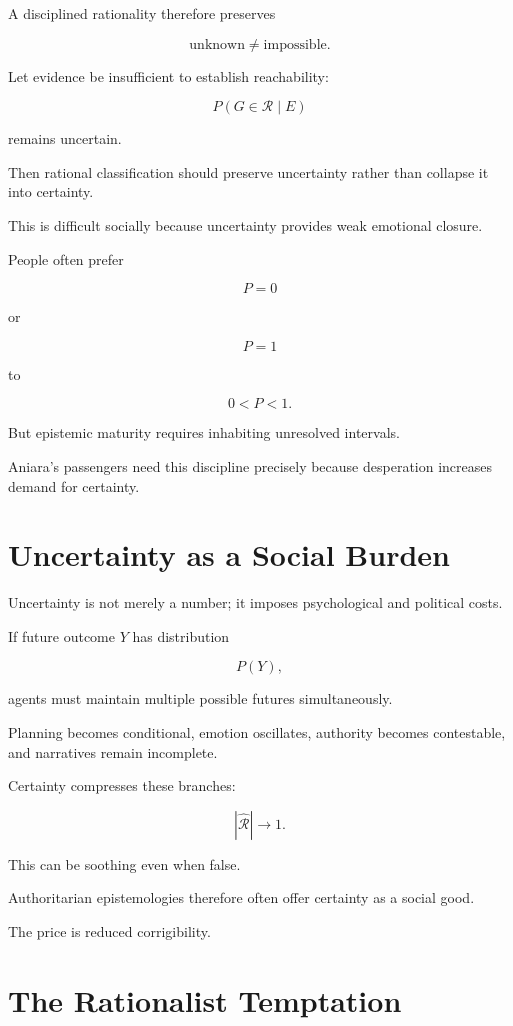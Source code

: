 \documentclass[11pt,oneside]{book}
\theoremstyle{definition}
\theoremstyle{remark}
\newcommand{\R}{\mathcal{R}}
\begin{document}
A disciplined rationality therefore preserves

\[
\text{unknown}
\neq
\text{impossible}.
\]

Let evidence be insufficient to establish reachability:

\[
P(G\in\R\mid E)
\]

remains uncertain.

Then rational classification should preserve uncertainty rather than collapse it into certainty.

This is difficult socially because uncertainty provides weak emotional closure.

People often prefer

\[
P=0
\]

or

\[
P=1
\]

to

\[
0<P<1.
\]

But epistemic maturity requires inhabiting unresolved intervals.

Aniara's passengers need this discipline precisely because desperation increases demand for certainty.

\section{Uncertainty as a Social Burden}

Uncertainty is not merely a number; it imposes psychological and political costs.

If future outcome \(Y\) has distribution

\[
P(Y),
\]

agents must maintain multiple possible futures simultaneously.

Planning becomes conditional, emotion oscillates, authority becomes contestable, and narratives remain incomplete.

Certainty compresses these branches:

\[
|\widehat{\R}|\rightarrow1.
\]

This can be soothing even when false.

Authoritarian epistemologies therefore often offer certainty as a social good.

The price is reduced corrigibility.

\section{The Rationalist Temptation}
\end{document}
